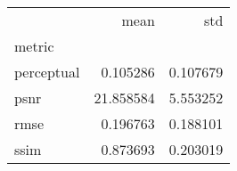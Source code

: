 \begin{tabular}{lrr}
\toprule
{} &       mean &       std \\
metric     &            &           \\
\midrule
perceptual &   0.105286 &  0.107679 \\
psnr       &  21.858584 &  5.553252 \\
rmse       &   0.196763 &  0.188101 \\
ssim       &   0.873693 &  0.203019 \\
\bottomrule
\end{tabular}

